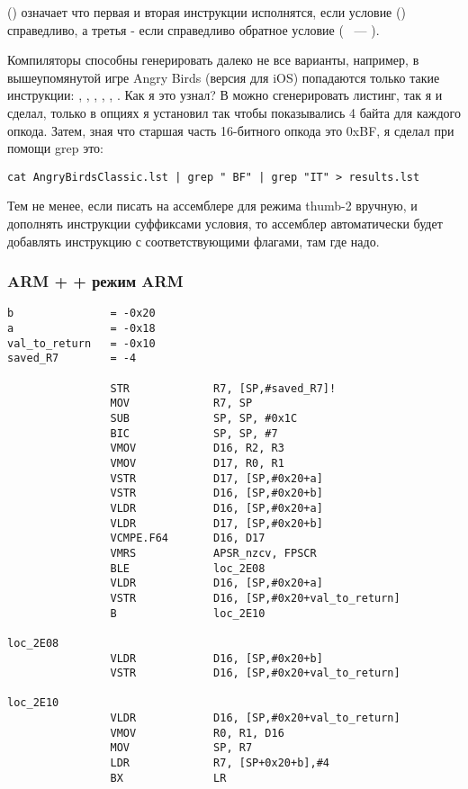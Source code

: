  () означает что первая и вторая инструкции исполнятся, если 
условие  () справедливо,
а третья - если справедливо обратное условие ( ~--- ).

Компиляторы способны генерировать далеко не все варианты, например, в вышеупомянутой игре Angry Birds
(версия  для iOS) попадаются только такие инструкции: , , , , 
, .
Как я это узнал? В \IDA можно сгенерировать листинг, так я и сделал, только в опциях я установил так 
чтобы показывались 4 байта для каждого опкода. Затем, зная что старшая часть 16-битного опкода  
это 0xBF, я сделал при помощи grep это:

\begin{lstlisting}
cat AngryBirdsClassic.lst | grep " BF" | grep "IT" > results.lst
\end{lstlisting}

Тем не менее, если писать на ассемблере для режима thumb-2 вручную, и дополнять инструкции суффиксами
условия, то ассемблер автоматически будет добавлять инструкцию  с соответствующими флагами, там
где надо.

\subsubsection{ARM + \NonOptimizingXcode + режим ARM}

\begin{lstlisting}
b               = -0x20
a               = -0x18
val_to_return   = -0x10
saved_R7        = -4

                STR             R7, [SP,#saved_R7]!
                MOV             R7, SP
                SUB             SP, SP, #0x1C
                BIC             SP, SP, #7
                VMOV            D16, R2, R3
                VMOV            D17, R0, R1
                VSTR            D17, [SP,#0x20+a]
                VSTR            D16, [SP,#0x20+b]
                VLDR            D16, [SP,#0x20+a]
                VLDR            D17, [SP,#0x20+b]
                VCMPE.F64       D16, D17
                VMRS            APSR_nzcv, FPSCR
                BLE             loc_2E08
                VLDR            D16, [SP,#0x20+a]
                VSTR            D16, [SP,#0x20+val_to_return]
                B               loc_2E10

loc_2E08
                VLDR            D16, [SP,#0x20+b]
                VSTR            D16, [SP,#0x20+val_to_return]

loc_2E10
                VLDR            D16, [SP,#0x20+val_to_return]
                VMOV            R0, R1, D16
                MOV             SP, R7
                LDR             R7, [SP+0x20+b],#4
                BX              LR
\end{lstlisting}


